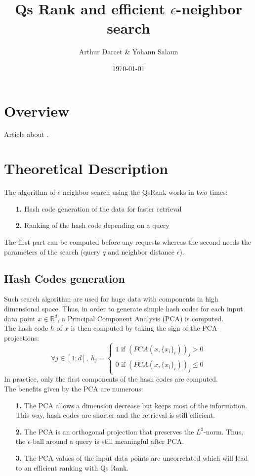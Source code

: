 \documentclass{article}
\title{Qs Rank and efficient $\epsilon$-neighbor search}
\author{Arthur Darcet \& Yohann Salaun}
\date{\today}
\newcommand{\RR}{\mathbb{R}}
\begin{document}
\maketitle

\section{Overview}

Article about \citep{QSRank}.

\section{Theoretical Description}

The algorithm of $\epsilon$-neighbor search using the QsRank works in two times:
\begin{itemize}
	\item[\textbf{1.}] Hash code generation of the data for faster retrieval
	\item[\textbf{2.}] Ranking of the hash code depending on a query
\end{itemize}
The first part can be computed before any requests whereas the second needs the parameters of the search (query $q$ and neighbor distance $\epsilon$).

\subsection{Hash Codes generation}

Such search algorithm are used for huge data with components in high dimensional space. Thus, in order to generate simple hash codes for each input data point $x \in \RR^d$, a Principal Component Analysis (PCA) is computed.\\
The hash code $h$ of $x$ is then computed by taking the sign of the PCA-projections:
\[	
\forall j \in [1;d],\ h_j = 	
 	\left \{
		\begin{array}{c}
    		1 \text{ if }(PCA(x, \{x_i\}_i))_j > 0 \\
    		0 \text{ if }(PCA(x, \{x_i\}_i))_j \leq 0
		\end{array}
	\right.
\]
In practice, only the first components of the hash codes are computed.\\
The benefits given by the PCA are numerous:
\begin{itemize}
	\item[\textbf{1.}] The PCA allows a dimension decrease but keeps most of the information. This way, hash codes are shorter and the retrieval is still efficient.
	\item[\textbf{2.}] The PCA is an orthogonal projection that preserves the $L^2$-norm. Thus, the $\epsilon$-ball around a query is still meaningful after PCA.
	\item[\textbf{3.}] The PCA values of the input data points are uncorrelated which will lead to an efficient ranking with Qs Rank.
\end{itemize}
\end{document}

